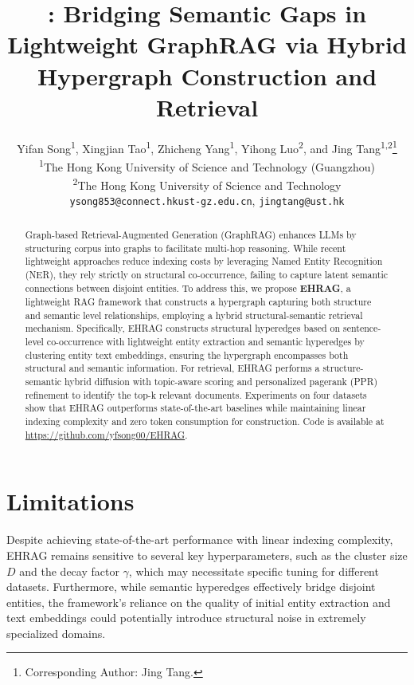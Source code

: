 \documentclass[11pt]{article}
\title{\EHGRAG: Bridging Semantic Gaps in Lightweight GraphRAG via Hybrid Hypergraph Construction and Retrieval}
\author{
  Yifan Song\textsuperscript{1}, \;
  Xingjian Tao\textsuperscript{1}, \;
  Zhicheng Yang\textsuperscript{1}, \;
  Yihong Luo\textsuperscript{2}, \;
  and Jing Tang\textsuperscript{1,2}\thanks{Corresponding Author: Jing Tang.} \\
  \textsuperscript{1}The Hong Kong University of Science and Technology (Guangzhou) \\
  \textsuperscript{2}The Hong Kong University of Science and Technology \\
  \texttt{ysong853@connect.hkust-gz.edu.cn}, \;
  \texttt{jingtang@ust.hk}
}
\theoremstyle{definition}
\newcommand{\EHGRAG}{EHRAG\xspace}
\begin{document}
\maketitle
\begin{abstract}

Graph-based Retrieval-Augmented Generation (GraphRAG) enhances LLMs by structuring corpus into graphs to facilitate multi-hop reasoning. While recent lightweight approaches reduce indexing costs by leveraging Named Entity Recognition (NER), they rely strictly on structural co-occurrence, failing to capture latent semantic connections between disjoint entities. To address this, we propose \textbf{\EHGRAG}, a lightweight RAG framework that constructs a hypergraph capturing both structure and semantic level relationships, employing a hybrid structural-semantic retrieval mechanism. Specifically, \EHGRAG constructs structural hyperedges based on sentence-level co-occurrence with lightweight entity extraction and semantic hyperedges by clustering entity text embeddings, ensuring the hypergraph encompasses both structural and semantic information. For retrieval, \EHGRAG performs a structure-semantic hybrid diffusion with topic-aware scoring and personalized pagerank (PPR) refinement to identify the top-k relevant documents. Experiments on four datasets show that \EHGRAG outperforms state-of-the-art baselines while maintaining linear indexing complexity and zero token consumption for construction. Code is available at \url{https://github.com/yfsong00/EHRAG}.
\end{abstract}
\begin{sloppy}




%

\end{sloppy}

\section*{Limitations}
Despite achieving state-of-the-art performance with linear indexing complexity, EHRAG remains sensitive to several key hyperparameters, such as the cluster size $D$ and the decay factor $\gamma$, which may necessitate specific tuning for different datasets. Furthermore, while semantic hyperedges effectively bridge disjoint entities, the framework's reliance on the quality of initial entity extraction and text embeddings could potentially introduce structural noise in extremely specialized domains.
\end{document}
